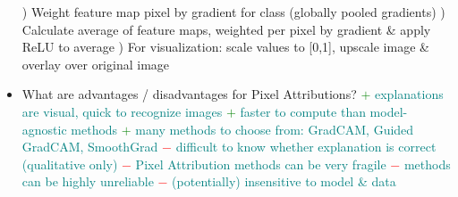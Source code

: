 \documentclass{report}
\newcommand{\asw}[2][teal]{}
\renewcommand{\asw}[2][teal]{\textcolor{#1}{#2}}
\begin{document}
\begin{itemize}
{			) Weight feature map pixel by gradient for class (globally pooled gradients)
			) Calculate average of feature maps, weighted per pixel by gradient \& apply ReLU to average
			) For visualization: scale values to [0,1], upscale image \& overlay over original image}
		\item What are advantages / disadvantages for Pixel Attributions?
		\asw{\newline \textcolor{green}{$+$} explanations are visual, quick to recognize images
			\newline \textcolor{green}{$+$} faster to compute than model-agnostic methods
			\newline \textcolor{green}{$+$} many methods to choose from: GradCAM, Guided GradCAM, SmoothGrad
			\newline \textcolor{red}{$-$} difficult to know whether explanation is correct (qualitative only)
			\newline \textcolor{red}{$-$} Pixel Attribution methods can be very fragile
			\newline \textcolor{red}{$-$} methods can be highly unreliable
			\newline \textcolor{red}{$-$} (potentially) insensitive to model \& data}
	\end{itemize}
	
\end{document}
